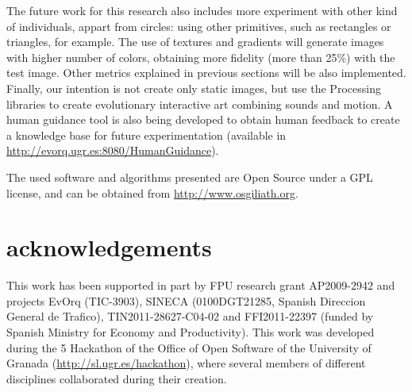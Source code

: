 \documentclass[conference]{IEEEtran}
\begin{document}
The future work for this research also includes more experiment with other kind of individuals, appart from circles: using other primitives, such as rectangles or triangles, for example. The use of textures and gradients will generate images with higher number of colors, obtaining more fidelity (more than 25\%) with the test image. Other metrics explained in previous sections will be also implemented. Finally, our intention is not create only static images, but use the Processing libraries to create evolutionary interactive art combining sounds and motion. A human guidance tool is also being developed to obtain human feedback to create a knowledge base for future experimentation (available in \url{http://evorq.ugr.es:8080/HumanGuidance}).

The used software and algorithms presented are Open Source under a GPL license, and can be obtained from \url{http://www.osgiliath.org}.

\section*{acknowledgements}
This work has been supported in part by FPU research grant AP2009-2942 and projects EvOrq (TIC-3903), SINECA (0100DGT21285, Spanish Direccion General de Trafico), TIN2011-28627-C04-02 and FFI2011-22397 (funded by Spanish Ministry for Economy and Productivity). This work was developed during the 5 Hackathon of the Office of Open Software of the University of Granada (\url{http://sl.ugr.es/hackathon}), where several members of different disciplines collaborated during their creation.



\end{document}
